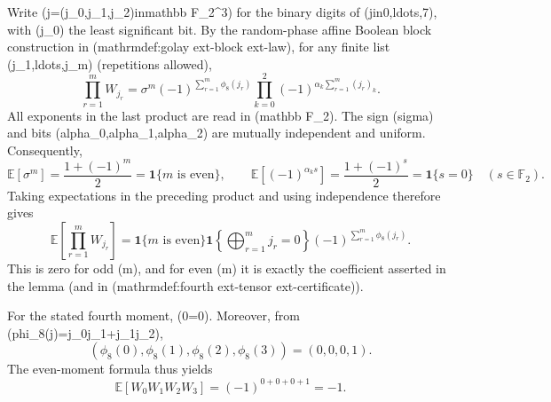 Write (j=(j_0,j_1,j_2)inmathbb F_2^3) for the binary digits of (jin{0,ldots,7}), with (j_0) the least significant bit.  By the random-phase affine Boolean block construction in (mathrm{def{:}golay	ext{-}block	ext{-}law}), for any finite list (j_1,ldots,j_m) (repetitions allowed),
\[
 \prod_{r=1}^m W_{j_r}
 =\sigma^m(-1)^{\sum_{r=1}^m\phi_8(j_r)}
   \prod_{k=0}^2(-1)^{\alpha_k\sum_{r=1}^m(j_r)_k}.
\]
All exponents in the last product are read in (mathbb F_2).  The sign (sigma) and bits (alpha_0,alpha_1,alpha_2) are mutually independent and uniform.  Consequently,
\[
 \mathbb E[\sigma^m]=\frac{1+(-1)^m}{2}=\mathbf 1\{m\text{ is even}\},
 \qquad
 \mathbb E[(-1)^{\alpha_k s}]=\frac{1+(-1)^s}{2}=\mathbf 1\{s=0\}
 \quad(s\in\mathbb F_2).
\]
Taking expectations in the preceding product and using independence therefore gives
\[
 \mathbb E\!\left[\prod_{r=1}^mW_{j_r}\right]
 =\mathbf 1\{m\text{ is even}\}
  \mathbf 1\!\left\{\bigoplus_{r=1}^m j_r=0\right\}
  (-1)^{\sum_{r=1}^m\phi_8(j_r)}.
\]
This is zero for odd (m), and for even (m) it is exactly the coefficient asserted in the lemma (and in (mathrm{def{:}fourth	ext{-}tensor	ext{-}certificate})).

For the stated fourth moment, (0=0).  Moreover, from (phi_8(j)=j_0j_1+j_1j_2),
\[
 (\phi_8(0),\phi_8(1),\phi_8(2),\phi_8(3))=(0,0,0,1).
\]
The even-moment formula thus yields
\[
 \mathbb E[W_0W_1W_2W_3]=(-1)^{0+0+0+1}=-1.
\]

